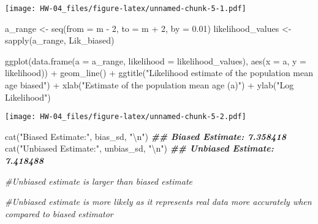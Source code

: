 \documentclass[
]{article}
\newenvironment{Shaded}{\begin{snugshade}}{\end{snugshade}}
\newcommand{\AttributeTok}[1]{\textcolor[rgb]{0.77,0.63,0.00}{#1}}
\newcommand{\CommentTok}[1]{\textcolor[rgb]{0.56,0.35,0.01}{\textit{#1}}}
\newcommand{\DecValTok}[1]{\textcolor[rgb]{0.00,0.00,0.81}{#1}}
\newcommand{\DocumentationTok}[1]{\textcolor[rgb]{0.56,0.35,0.01}{\textbf{\textit{#1}}}}
\newcommand{\FloatTok}[1]{\textcolor[rgb]{0.00,0.00,0.81}{#1}}
\newcommand{\FunctionTok}[1]{\textcolor[rgb]{0.00,0.00,0.00}{#1}}
\newcommand{\NormalTok}[1]{#1}
\newcommand{\OtherTok}[1]{\textcolor[rgb]{0.56,0.35,0.01}{#1}}
\newcommand{\SpecialCharTok}[1]{\textcolor[rgb]{0.00,0.00,0.00}{#1}}
\newcommand{\StringTok}[1]{\textcolor[rgb]{0.31,0.60,0.02}{#1}}
\begin{document}
\texttt{[image: HW-04\_files/figure-latex/unnamed-chunk-5-1.pdf]}

\begin{Shaded}
\begin{Highlighting}[]


\NormalTok{a\_range }\OtherTok{\textless{}{-}} \FunctionTok{seq}\NormalTok{(}\AttributeTok{from =}\NormalTok{ m }\SpecialCharTok{{-}} \DecValTok{2}\NormalTok{, }\AttributeTok{to =}\NormalTok{ m }\SpecialCharTok{+} \DecValTok{2}\NormalTok{, }\AttributeTok{by =} \FloatTok{0.01}\NormalTok{)}
\NormalTok{likelihood\_values }\OtherTok{\textless{}{-}} \FunctionTok{sapply}\NormalTok{(a\_range, Lik\_biased)}


\FunctionTok{ggplot}\NormalTok{(}\FunctionTok{data.frame}\NormalTok{(}\AttributeTok{a =}\NormalTok{ a\_range, }\AttributeTok{likelihood =}\NormalTok{ likelihood\_values), }\FunctionTok{aes}\NormalTok{(}\AttributeTok{x =}\NormalTok{ a, }\AttributeTok{y =}\NormalTok{ likelihood)) }\SpecialCharTok{+}
  \FunctionTok{geom\_line}\NormalTok{() }\SpecialCharTok{+}
  \FunctionTok{ggtitle}\NormalTok{(}\StringTok{"Likelihood estimate of the population mean age biased"}\NormalTok{) }\SpecialCharTok{+}
  \FunctionTok{xlab}\NormalTok{(}\StringTok{"Estimate of the population mean age (a)"}\NormalTok{) }\SpecialCharTok{+}
  \FunctionTok{ylab}\NormalTok{(}\StringTok{"Log Likelihood"}\NormalTok{)}
\end{Highlighting}
\end{Shaded}

\texttt{[image: HW-04\_files/figure-latex/unnamed-chunk-5-2.pdf]}

\begin{Shaded}
\begin{Highlighting}[]

\FunctionTok{cat}\NormalTok{(}\StringTok{"Biased Estimate:"}\NormalTok{, bias\_sd, }\StringTok{"}\SpecialCharTok{\textbackslash{}n}\StringTok{"}\NormalTok{)}
\DocumentationTok{\#\# Biased Estimate: 7.358418}
\FunctionTok{cat}\NormalTok{(}\StringTok{"Unbiased Estimate:"}\NormalTok{, unbias\_sd, }\StringTok{"}\SpecialCharTok{\textbackslash{}n}\StringTok{"}\NormalTok{)}
\DocumentationTok{\#\# Unbiased Estimate: 7.418488}

\CommentTok{\#Unbiased estimate is larger than biased estimate}

\CommentTok{\#Unbiased estimate is more likely as it represents real data more accurately when compared to biased estimator}
\end{Highlighting}
\end{Shaded}
\end{document}
